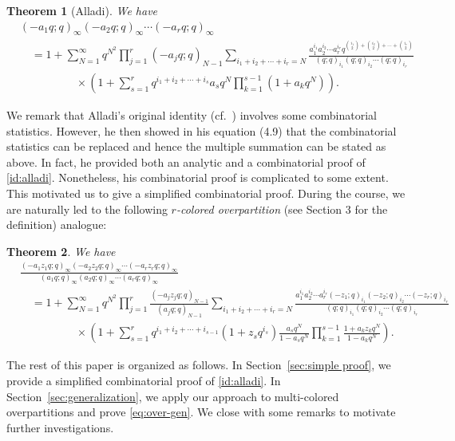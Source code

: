 \documentclass[12pt,reqno]{amsart}
\numberwithin{equation}{section}
\theoremstyle{plain}
\newtheorem{theorem}{Theorem}[section]
\theoremstyle{definition}
\begin{document}
\begin{theorem}[Alladi]\label{thm:alladi}
We have
\begin{align}
&(-a_{1}q;q)_{\infty}(-a_{2}q;q)_{\infty}\cdots(-a_{r}q;q)_{\infty}\nonumber\\
&\quad=1+\sum_{N=1}^{\infty}q^{N^{2}}\prod_{j=1}^{r}(-a_{j}q;q)_{N-1} \sum_{i_{1}+i_{2}+\cdots+i_{r}=N}\frac{a_{1}^{i_{1}}a_{2}^{i_{2}}\cdots a_{r}^{i_{r}}q^{\binom{i_1}{2}+\binom{i_2}{2}+\cdots+\binom{i_r}{2}}}{(q;q)_{i_{1}}(q;q)_{i_{2}}\cdots(q;q)_{i_{r}}}\nonumber\\
&\quad\quad\quad\quad\quad\times \left(1+\sum_{s=1}^{r}q^{i_1+i_2+\cdots+i_s}a_s q^N \prod_{k=1}^{s-1}\left(1+a_k q^N\right)\right).\label{id:alladi}
\end{align}
\end{theorem}

We remark that Alladi's original identity (cf.~\cite[Eq.~(4.8)]{All}) involves some combinatorial statistics. However, he then showed in his equation (4.9) that the combinatorial statistics can be replaced and hence the multiple summation can be stated as above. In fact, he provided both an analytic and a combinatorial proof of \eqref{id:alladi}. Nonetheless, his combinatorial proof is complicated to some extent. This motivated us to give a simplified combinatorial proof. During the course, we are naturally led to the following {\em$r$-colored overpartition} (see Section 3 for the definition) analogue:
\begin{theorem}\label{thm:CFT}
We have
\begin{align}
&\frac{(-a_{1} z_1 q;q)_{\infty}(-a_{2} z_2 q;q)_{\infty}\cdots(-a_{r} z_r q;q)_{\infty}}{(a_{1}q;q)_{\infty}(a_{2}q;q)_{\infty}\cdots(a_{r}q;q)_{\infty}}\nonumber\\
&\quad=1+\sum_{N=1}^{\infty}q^{N^{2}}\prod_{j=1}^{r}\frac{(-a_{j} z_j q;q)_{N-1}}{(a_{j}q;q)_{N-1}} \sum_{i_{1}+i_{2}+\cdots+i_{r}=N}\frac{a_{1}^{i_{1}}a_{2}^{i_{2}}\cdots a_{r}^{i_{r}}(-z_1;q)_{i_{1}}(-z_2;q)_{i_{2}}\cdots(-z_r;q)_{i_{r}}}{(q;q)_{i_{1}}(q;q)_{i_{2}}\cdots(q;q)_{i_{r}}}\nonumber\\
&\quad\quad\quad\quad\quad\times \left(1+\sum_{s=1}^{r}q^{i_1+i_2+\cdots+i_{s-1}}\left(1+z_s q^{i_s}\right) \frac{a_s q^N}{1-a_s q^N}  \prod_{k=1}^{s-1} \frac{1+a_k z_k q^N}{1-a_k q^N}\right).\label{eq:over-gen}
\end{align}
\end{theorem}

The rest of this paper is organized as follows. In Section~\ref{sec:simple proof}, we provide a simplified combinatorial proof of \eqref{id:alladi}. In Section~\ref{sec:generalization}, we apply our approach to multi-colored overpartitions and prove \eqref{eq:over-gen}. We close with some remarks to motivate further investigations.
\end{document}
